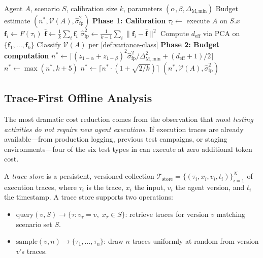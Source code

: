 \begin{algorithm}[t]
\caption{Adaptive Budget Calibration}
\label{alg:budget}
\begin{algorithmic}[1]
\REQUIRE Agent $A$, scenario $S$, calibration size $k$,
  parameters $(\alpha, \beta, \Delta_{\mathrm{M,min}})$
\ENSURE Budget estimate $(n^*, \mathcal{V}(A),
  \hat{\sigma}^2_{\mathrm{fp}})$
\STATE \textbf{Phase 1: Calibration}
  \STATE $\tau_i \gets$ execute $A$ on $S.x$
  \STATE $\mathbf{f}_i \gets F(\tau_i)$
\ENDFOR
\STATE $\bar{\mathbf{f}} \gets \frac{1}{k}\sum_i \mathbf{f}_i$
\STATE $\hat{\sigma}^2_{\mathrm{fp}} \gets
  \frac{1}{k-1}\sum_i \|\mathbf{f}_i - \bar{\mathbf{f}}\|^2$
\STATE Compute $d_{\mathrm{eff}}$ via PCA on
  $\{\mathbf{f}_1, \ldots, \mathbf{f}_k\}$
\STATE Classify $\mathcal{V}(A)$ per \cref{def:variance-class}
\STATE \textbf{Phase 2: Budget computation}
\STATE $n^* \gets \lceil
  (z_{1-\alpha} + z_{1-\beta})^2 \hat{\sigma}^2_{\mathrm{fp}} /
  \Delta_{\mathrm{M,min}}^2 + (d_{\mathrm{eff}} + 1)/2 \rceil$
\STATE $n^* \gets \max(n^*, k + 5)$
\STATE $n^* \gets \lceil n^* \cdot (1 + \sqrt{2/k}) \rceil$
\RETURN $(n^*, \mathcal{V}(A), \hat{\sigma}^2_{\mathrm{fp}})$
\end{algorithmic}
\end{algorithm}

\subsection{Trace-First Offline Analysis}
\label{sec:token:trace-first}

The most dramatic cost reduction comes from the observation that
\emph{most testing activities do not require new agent executions}.
If execution traces are already available---from production logging,
previous test campaigns, or staging environments---four of the six
test types in \agentassay{} can execute at zero additional token cost.

\begin{definition}
\label{def:trace-store}
A \emph{trace store} is a persistent, versioned collection
$\mathcal{T}_{\mathrm{store}} = \{(\tau_i, x_i, v_i, t_i)\}_{i=1}^{N}$
of execution traces, where $\tau_i$ is the trace, $x_i$ the input,
$v_i$ the agent version, and $t_i$ the timestamp. A trace store
supports two operations:
\begin{itemize}[leftmargin=*]
  \item $\mathrm{query}(v, S) \to \{\tau : v_\tau = v,\;
    x_\tau \in S\}$: retrieve traces for version $v$ matching scenario
    set $S$.
  \item $\mathrm{sample}(v, n) \to \{\tau_1, \ldots, \tau_n\}$: draw
    $n$ traces uniformly at random from version $v$'s traces.
\end{itemize}
\end{definition}

